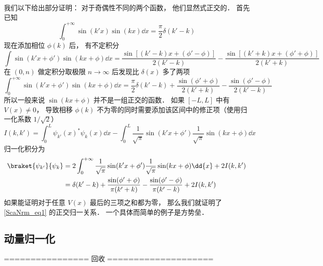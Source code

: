 我们以下给出部分证明： 对于奇偶性不同的两个函数， 他们显然式正交的． 首先已知
\begin{equation}
\int_{0}^{+\infty} \sin(k'x)\sin(kx)\dd{x} = \frac{\pi}{2}\delta(k'-k)
\end{equation}
现在添加相位 $\phi(k)$ 后， 有不定积分
\begin{equation}
\int \sin(k'x+\phi')\sin(kx+\phi) \dd{x} = \frac{\sin[(k'-k)x + (\phi'-\phi)]}{2(k'-k)}
- \frac{\sin[(k'+k)x+(\phi'+\phi)]}{2(k'+k)}
\end{equation}
在 $(0,n)$ 做定积分取极限 $n\to\infty$ 后发现比 $\delta(x)$ 多了两项
\begin{equation}
\int_{0}^{+\infty} \sin(k'x+\phi')\sin(kx+\phi) \dd{x} = \frac{\pi}{2}\delta(k'-k)
+ \frac{\sin(\phi'+\phi)}{2(k'+k)} - \frac{\sin(\phi'-\phi)}{2(k'-k)}
\end{equation}
所以一般来说 $\sin(kx+\phi)$ 并不是一组正交的函数． 如果 $[-L,L]$ 中有 $V(x) \ne 0$， 导致相移 $\phi(k)$ 不为零的同时需要添加该区间中的修正项（使用归一化系数 $1/\sqrt{2}$）
\begin{equation}
I(k,k') = \int_0^L \psi_{k'}(x)^* \psi_k(x) \dd{x}
-\int_{0}^{L} \frac{1}{\sqrt{\pi}}\sin(k'x+\phi') \frac{1}{\sqrt{\pi}}\sin(kx+\phi) \dd{x}
\end{equation}
归一化积分为
\begin{equation}
\begin{aligned}
\braket{\psi_{k'}}{\psi_k} &= 2\int_{0}^{+\infty} \frac{1}{\sqrt{\pi}}\sin(k'x+\phi')\frac{1}{\sqrt{\pi}}\sin(kx+\phi) \dd{x} + 2I(k,k')\\
&= \delta(k'-k) + \frac{\sin(\phi'+\phi)}{\pi(k'+k)} - \frac{\sin(\phi'-\phi)}{\pi(k'-k)} + 2I(k,k')
\end{aligned}
\end{equation}
如果能证明对于任意 $V(x)$ 最后的三项之和都为零， 那么我们就证明了\autoref{ScaNrm_eq1} 的正交归一关系． 一个具体而简单的例子是方势垒．


\subsection{动量归一化}


================ 回收 ====================

